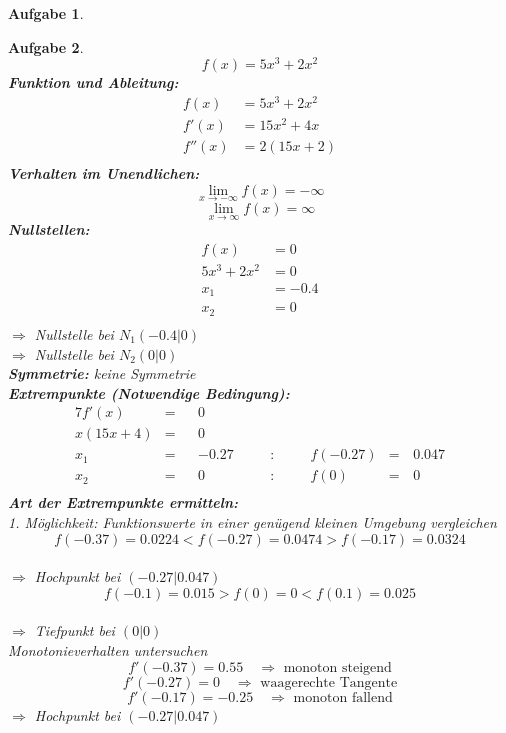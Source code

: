 \documentclass[12pt]{article}
\theoremstyle{note}
\newtheorem{aufgabe}{Aufgabe}
\begin{document}
\begin{flushleft}
\begin{aufgabe}
\end{aufgabe}\clearpage\begin{aufgabe} ~  
$$f(x)=5 x^{3} + 2 x^{2}$$ 
{\bf Funktion und Ableitung:} 
\begin{align*} 
f(x)&=5 x^{3} + 2 x^{2}\\ 
f'(x)&=15 x^{2} + 4 x\\ 
f''(x)&=2 \left(15 x + 2\right)\\ 
\end{align*} 
{\bf Verhalten im Unendlichen:} 
\[ \lim_{x\rightarrow -\infty} f(x) =-\infty\]\[ \lim_{x\rightarrow\infty} f(x) =\infty\]{\bf Nullstellen:} 
\begin{align*} 
f(x)&=0 \\ 
5 x^{3} + 2 x^{2}&=0 \\ 
x_1&=-0.4\\ 
x_2&=0\\ 
\end{align*} 
$\Rightarrow$ Nullstelle bei $N_1(-0.4|0)$ \\ 
$\Rightarrow$ Nullstelle bei $N_2(0|0)$ \\ 
{\bf Symmetrie:} 
keine Symmetrie \\ 
{\bf Extrempunkte (Notwendige Bedingung):} 
\begin{alignat*}{7} 
f'(x)&=& &0& \\ 
x \left(15 x + 4\right)&=& &0& \\ 
x_1&=& &-0.27& \quad &:& \quad &f(-0.27)&=& \,0.047\\ 
x_2&=& &0& \quad &:& \quad &f(0)&=& \,0\\ 
\end{alignat*} 
{\bf Art der Extrempunkte ermitteln:} \\[1em] 
{\em 1. M\"oglichkeit:} Funktionswerte in einer gen\"ugend kleinen Umgebung vergleichen \\ 
$$f(-0.37)=0.0224  <  f(-0.27)=0.0474  >  f(-0.17)=0.0324$$\\ 
$\Rightarrow$ Hochpunkt bei $(-0.27|0.047)$ \\ 
\vspace{1em}$$f(-0.1)=0.015  >  f(0)=0  <   f(0.1)=0.025$$\\ 
$\Rightarrow$ Tiefpunkt bei $(0|0)$ \\ 
\vspace{1em}{\em 2. M\"oglichkeit:} Monotonieverhalten untersuchen \\ 
$$f'(-0.37)=0.55\quad \Rightarrow \text{ monoton steigend} $$$$f'(-0.27)=0 \quad \Rightarrow \text{ waagerechte Tangente} $$$$f'(-0.17)=-0.25\quad \Rightarrow \text{ monoton fallend} $$$\Rightarrow$ Hochpunkt bei $(-0.27|0.047)$ \\ 

\end{aufgabe}
\end{flushleft}
\end{document}
